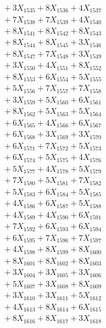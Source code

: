 \documentclass[a4paper,10pt]{article}
\begin{document}
{\begin{align}
&\;  + 3 X_{1535} + 8 X_{1536} + 4 X_{1537} \\[0.3ex]
&\;  + 7 X_{1538} + 7 X_{1539} + 4 X_{1540} \\[0.5ex]\allowbreak
&\;  + 8 X_{1541} + 8 X_{1542} + 8 X_{1543} \\[0.3ex]
&\;  + 8 X_{1544} + 8 X_{1545} + 3 X_{1546} \\[0.3ex]
&\;  + 8 X_{1547} + 7 X_{1548} + 3 X_{1549} \\[0.3ex]
&\;  + 3 X_{1550} + 4 X_{1551} + 8 X_{1552} \\[0.3ex]
&\;  + 8 X_{1553} + 6 X_{1554} + 5 X_{1555} \\[0.3ex]
&\;  + 5 X_{1556} + 7 X_{1557} + 7 X_{1558} \\[0.3ex]
&\;  + 3 X_{1559} + 5 X_{1560} + 6 X_{1561} \\[0.3ex]
&\;  + 8 X_{1562} + 5 X_{1563} + 5 X_{1564} \\[0.3ex]
&\;  + 6 X_{1565} + 4 X_{1566} + 6 X_{1567} \\[0.3ex]
&\;  + 6 X_{1568} + 3 X_{1569} + 3 X_{1570} \\[0.5ex]\allowbreak
&\;  + 6 X_{1571} + 7 X_{1572} + 5 X_{1573} \\[0.3ex]
&\;  + 6 X_{1574} + 5 X_{1575} + 4 X_{1576} \\[0.3ex]
&\;  + 5 X_{1577} + 4 X_{1578} + 5 X_{1579} \\[0.3ex]
&\;  + 7 X_{1580} + 5 X_{1581} + 7 X_{1582} \\[0.3ex]
&\;  + 5 X_{1583} + 6 X_{1584} + 5 X_{1585} \\[0.3ex]
&\;  + 4 X_{1586} + 6 X_{1587} + 5 X_{1588} \\[0.3ex]
&\;  + 4 X_{1589} + 4 X_{1590} + 6 X_{1591} \\[0.3ex]
&\;  + 7 X_{1592} + 6 X_{1593} + 6 X_{1594} \\[0.3ex]
&\;  + 6 X_{1595} + 7 X_{1596} + 7 X_{1597} \\[0.3ex]
&\;  + 4 X_{1598} + 8 X_{1599} + 8 X_{1600} \\[0.5ex]\allowbreak
&\;  + 8 X_{1601} + 8 X_{1602} + 8 X_{1603} \\[0.3ex]
&\;  + 3 X_{1604} + 3 X_{1605} + 3 X_{1606} \\[0.3ex]
&\;  + 5 X_{1607} + 3 X_{1608} + 8 X_{1609} \\[0.3ex]
&\;  + 3 X_{1610} + 3 X_{1611} + 5 X_{1612} \\[0.3ex]
&\;  + 4 X_{1613} + 8 X_{1614} + 6 X_{1615} \\[0.3ex]
&\;  + 8 X_{1616} + 8 X_{1617} + 3 X_{1618} \\[0.3ex]

\end{align}}
\end{document}
